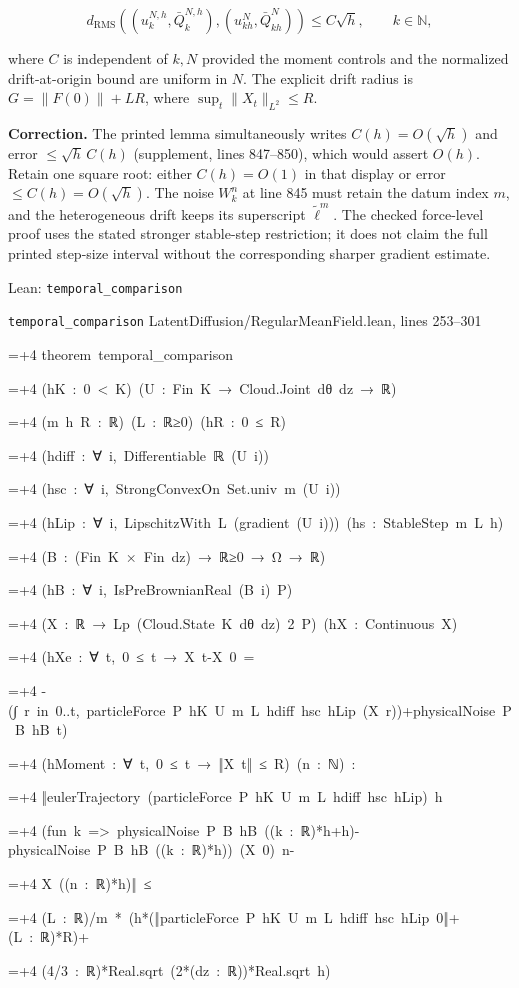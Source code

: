 \documentclass[11pt,a4paper]{report}
\newlength{\leancharwidth}
\newenvironment{leancode}{\par\smallskip\begingroup\ttfamily\footnotesize\raggedright
  \settowidth{\leancharwidth}{M}\setlength{\parskip}{0pt}\setlength{\parindent}{0pt}
  \frenchspacing}{\par\endgroup\smallskip}
\newcommand{\leanline}[2]{\hangindent=\dimexpr#1\leancharwidth+4\leancharwidth\relax
  \hangafter=1\noindent\hspace*{#1\leancharwidth}#2\par}
\newcommand{\leansource}[1]{\par{\footnotesize\color{leanmuted}#1}\par}
\begin{document}
        \[d_{\mathrm{RMS}}((u_k^{N,h},\bar Q_k^{N,h}),
                    (u_{kh}^{N},\bar Q_{kh}^{N}))\le C\sqrt h,
          \qquad k\in\mathbb N,\]


where \(C\) is independent of \(k,N\) provided the moment controls
        and the normalized drift-at-origin bound are uniform in \(N\).
        The explicit drift radius is \(G=\|F(0)\|+LR\), where
        \(\sup_t\|X_t\|_{L^2}\le R\).



\textbf{Correction.} The printed lemma simultaneously writes
        \(C(h)=O(\sqrt h)\) and error \(\le\sqrt h\,C(h)\)
        (supplement, lines 847–850), which would assert \(O(h)\). Retain one
        square root: either \(C(h)=O(1)\) in that display or error
        \(\le C(h)=O(\sqrt h)\). The noise \(W_k^n\) at line 845 must retain
        the datum index \(m\), and the heterogeneous drift keeps its superscript
        \(\widetilde\ell^m\). The checked force-level proof uses the stated
        stronger stable-step restriction; it does not claim the full printed
        step-size interval without the corresponding sharper gradient estimate.

\begin{leanbox}{Lean: \texttt{temporal\_\allowbreak{}comparison}}
\leansource{\texttt{temporal\_\allowbreak{}comparison} \quad LatentDiffusion/\allowbreak{}RegularMeanField.lean, lines 253–301}
\begin{leancode}
\leanline{0}{theorem\ temporal\_comparison}
\leanline{4}{(hK\ :\ 0\ <\ K)\ (U\ :\ Fin\ K\ →\ Cloud.Joint\ dθ\ dz\ →\ ℝ)}
\leanline{4}{(m\ h\ R\ :\ ℝ)\ (L\ :\ ℝ≥0)\ (hR\ :\ 0\ ≤\ R)}
\leanline{4}{(hdiff\ :\ ∀\ i,\ Differentiable\ ℝ\ (U\ i))}
\leanline{4}{(hsc\ :\ ∀\ i,\ StrongConvexOn\ Set.univ\ m\ (U\ i))}
\leanline{4}{(hLip\ :\ ∀\ i,\ LipschitzWith\ L\ (gradient\ (U\ i)))\ (hs\ :\ StableStep\ m\ L\ h)}
\leanline{4}{(B\ :\ (Fin\ K\ ×\ Fin\ dz)\ →\ ℝ≥0\ →\ Ω\ →\ ℝ)}
\leanline{4}{(hB\ :\ ∀\ i,\ IsPreBrownianReal\ (B\ i)\ P)}
\leanline{4}{(X\ :\ ℝ\ →\ Lp\ (Cloud.State\ K\ dθ\ dz)\ 2\ P)\ (hX\ :\ Continuous\ X)}
\leanline{4}{(hXe\ :\ ∀\ t,\ 0\ ≤\ t\ →\ X\ t-X\ 0\ =}
\leanline{6}{-(∫\ r\ in\ 0..t,\ particleForce\ P\ hK\ U\ m\ L\ hdiff\ hsc\ hLip\ (X\ r))+physicalNoise\ P\ B\ hB\ t)}
\leanline{4}{(hMoment\ :\ ∀\ t,\ 0\ ≤\ t\ →\ ‖X\ t‖\ ≤\ R)\ (n\ :\ ℕ)\ :}
\leanline{4}{‖eulerTrajectory\ (particleForce\ P\ hK\ U\ m\ L\ hdiff\ hsc\ hLip)\ h}
\leanline{6}{(fun\ k\ =>\ physicalNoise\ P\ B\ hB\ ((k\ :\ ℝ)*h+h)-physicalNoise\ P\ B\ hB\ ((k\ :\ ℝ)*h))\ (X\ 0)\ n-}
\leanline{6}{X\ ((n\ :\ ℝ)*h)‖\ ≤}
\leanline{6}{(L\ :\ ℝ)/m\ *\ (h*(‖particleForce\ P\ hK\ U\ m\ L\ hdiff\ hsc\ hLip\ 0‖+(L\ :\ ℝ)*R)+}
\leanline{8}{(4/3\ :\ ℝ)*Real.sqrt\ (2*(dz\ :\ ℝ))*Real.sqrt\ h)}
\end{leancode}
\end{leanbox}
\end{document}
